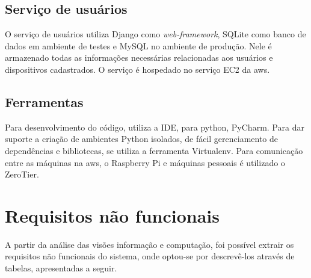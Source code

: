 \documentclass[]{politex}
\begin{document}
\subsection{Serviço de usuários}
O serviço de usuários utiliza Django como \textit{web-framework}, SQLite como banco de dados em ambiente de testes e MySQL no ambiente de produção. Nele é armazenado todas as informações necessárias relacionadas aos usuários e dispositivos cadastrados. O serviço é hospedado no serviço EC2 da \acrshort{aws}.

\subsection{Ferramentas}
Para desenvolvimento do código, utiliza a IDE, para python, PyCharm. Para dar suporte a criação de ambientes Python isolados, de fácil gerenciamento de dependências e bibliotecas, se utiliza a ferramenta Virtualenv. Para comunicação entre as máquinas na \acrshort{aws}, o Raspberry Pi e máquinas pessoais é utilizado o ZeroTier. 

\section{Requisitos não funcionais}
A partir da análise das visões informação e computação, foi possível extrair os requisitos não funcionais do sistema, onde optou-se por descrevê-los através de tabelas, apresentadas a seguir.
\end{document}

